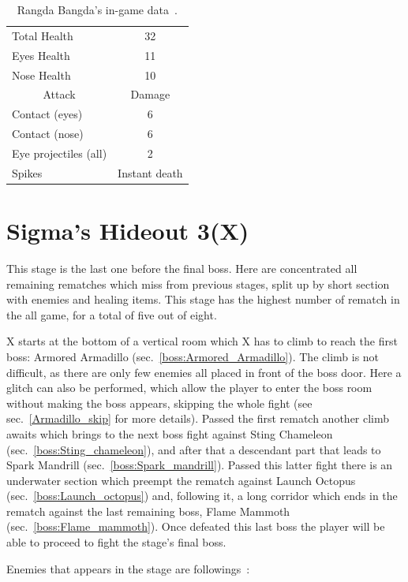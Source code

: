 \begin{table}
	\centering
	\begin{tabular}[h]{l c}
		\toprule
		Total Health  & 32\\
		Eyes Health & 11\\
		Nose Health & 10\\
		\midrule
		\multicolumn{1}{c}{Attack} & \multicolumn{1}{c}{Damage}\\
		Contact (eyes) & 6\\
		Contact (nose) & 6\\
		Eye projectiles (all) & 2\\
		Spikes & Instant death\\
		\bottomrule
	\end{tabular}
	\caption{Rangda Bangda's in-game data~\cite{wiki:Rangda_bangda}. }
\end{table}

\chapter{Sigma's Hideout 3(X)}
This stage is the last one before the final boss. Here are concentrated all remaining rematches which miss from previous stages, split up by short section with enemies and healing items. This stage has the highest number of rematch in the all game, for a total of five out of eight.

X starts at the bottom of a vertical room which X has to climb to reach the first boss: Armored Armadillo (sec.~\ref{boss:Armored_Armadillo}). The climb is not difficult, as there are only few enemies all placed in front of the boss door. Here a glitch can also be performed, which allow the player to enter the boss room without making the boss appears, skipping the whole fight (see sec.~\ref{Armadillo_skip} for more details). Passed the first rematch another climb awaits which brings to the next boss fight against Sting Chameleon (sec.~\ref{boss:Sting_chameleon}), and after that a descendant part that leads to Spark Mandrill (sec.~\ref{boss:Spark_mandrill}). Passed this latter fight there is an underwater section which preempt the rematch against Launch Octopus (sec.~\ref{boss:Launch_octopus}) and, following it, a long corridor which ends in the rematch against the last remaining boss, Flame Mammoth (sec.~\ref{boss:Flame_mammoth}). Once defeated this last boss the player will be able to proceed to fight the stage's final boss.

Enemies that appears in the stage are followings~\cite{wiki:sigma_stages}:

